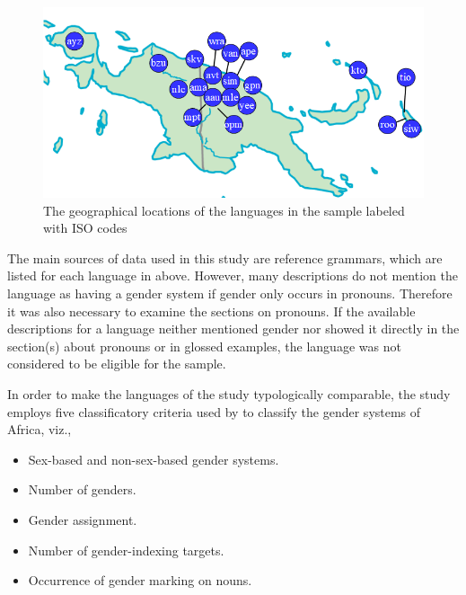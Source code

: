 \documentclass[output=collectionpaper]{langsci/langscibook}
\begin{document}

\begin{figure}[htb]
\includegraphics[width=.8\textwidth]{figures/09/Simple/fig1.png}
\caption{The geographical locations of the languages in the sample labeled with ISO codes}
\label{fig:Svard:1}
\end{figure}


The main sources of data used in this study are reference grammars, which are listed for each language in  above. However, many descriptions do not mention the language as having a gender system if gender only occurs in pronouns. Therefore it was also necessary to examine the sections on pronouns. If the available descriptions for a language neither mentioned gender nor showed it directly in the section(s) about pronouns or in glossed examples, the language was not considered to be eligible for the sample.

In order to make the languages of the study typologically comparable, the study employs five classificatory criteria used by \citet{DiGarbo2014} to classify the gender systems of Africa, viz.,

\begin{itemize}
\item Sex-based and non-sex-based gender systems.
\item Number of genders.
\item Gender assignment.
\item Number of gender-indexing targets.
\item Occurrence of gender marking on nouns.
\end{itemize}
\end{document}
